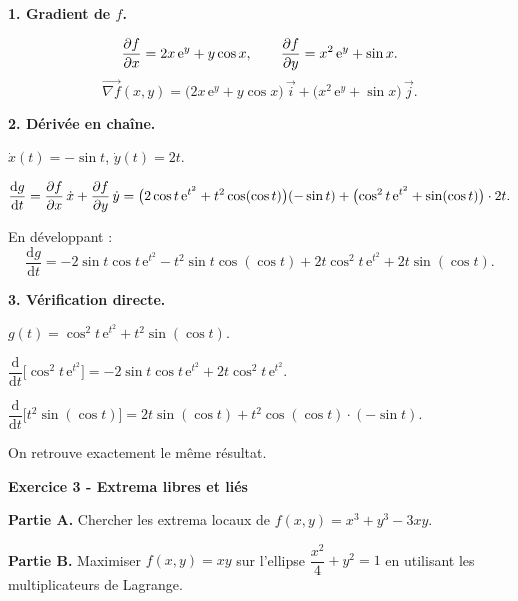 \documentclass[12pt,a4paper]{article}
\begin{document}
\begin{boitecorrige}
\textbf{1. Gradient de $f$.}

\[
\dfrac{\partial f}{\partial x} = 2x\,\mathrm{e}^y + y\cos x, \qquad \dfrac{\partial f}{\partial y} = x^2\,\mathrm{e}^y + \sin x.
\]
\[
\overrightarrow{\nabla f}(x,y) = \bigl(2x\,\mathrm{e}^y + y\cos x\bigr)\,\vec{i} + \bigl(x^2\,\mathrm{e}^y + \sin x\bigr)\,\vec{j}.
\]

\textbf{2. Dérivée en chaîne.}

$\dot{x}(t) = -\sin t$, $\dot{y}(t) = 2t$.

\[
\frac{\mathrm{d}g}{\mathrm{d}t} = \dfrac{\partial f}{\partial x}\,\dot{x} + \dfrac{\partial f}{\partial y}\,\dot{y}
= \bigl(2\cos t\,\mathrm{e}^{t^2} + t^2\cos(\cos t)\bigr)(-\sin t) + \bigl(\cos^2 t\,\mathrm{e}^{t^2} + \sin(\cos t)\bigr)\cdot 2t.
\]

En développant :
\[
\frac{\mathrm{d}g}{\mathrm{d}t} = -2\sin t\cos t\,\mathrm{e}^{t^2} - t^2\sin t\cos(\cos t) + 2t\cos^2 t\,\mathrm{e}^{t^2} + 2t\sin(\cos t).
\]

\textbf{3. Vérification directe.}

$g(t) = \cos^2 t\,\mathrm{e}^{t^2} + t^2\sin(\cos t)$.

$\dfrac{\mathrm{d}}{\mathrm{d}t}\bigl[\cos^2 t\,\mathrm{e}^{t^2}\bigr] = -2\sin t\cos t\,\mathrm{e}^{t^2} + 2t\cos^2 t\,\mathrm{e}^{t^2}$.

$\dfrac{\mathrm{d}}{\mathrm{d}t}\bigl[t^2\sin(\cos t)\bigr] = 2t\sin(\cos t) + t^2\cos(\cos t)\cdot(-\sin t)$.

On retrouve exactement le même résultat.
\end{boitecorrige}

\begin{boiteexercice}
\textbf{Exercice 3 - Extrema libres et liés}\niveau{\moyen}

\textbf{Partie A.} Chercher les extrema locaux de $f(x,y) = x^3 + y^3 - 3xy$.

\textbf{Partie B.} Maximiser $f(x,y) = xy$ sur l'ellipse $\dfrac{x^2}{4} + y^2 = 1$ en utilisant les multiplicateurs de Lagrange.
\end{boiteexercice}
\end{document}
